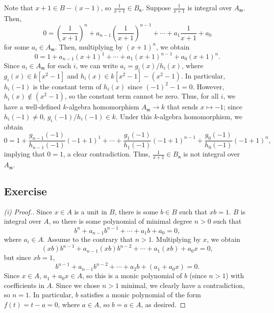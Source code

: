 Note that $x+1 \in B - (x-1)$, so $\frac{1}{x+1} \in B_{\mathfrak{n}}$. Suppose $\frac{1}{x+1}$ is integral over $A_{\mathfrak{m}}$. Then,
$$0 = \left(\frac{1}{x+1}\right)^n + a_{n-1}\left(\frac{1}{x+1}\right)^{n-1} + \cdots + a_1 \frac{1}{x+1} + a_0$$
for some $a_i \in A_{\mathfrak{m}}$. Then, multiplying by $(x+1)^n$, we obtain
$$0 = 1 + a_{n-1}(x+1)^1 + \cdots + a_1 (x+1)^{n-1} + a_0 (x+1)^n.$$
Since $a_i \in A_{\mathfrak{m}}$ for each $i$, we can write $a_i = g_i(x)/h_i(x)$, where $g_i(x) \in k[x^2-1]$ and $h_i(x) \in k[x^2 - 1] - (x^2 - 1)$. In particular,
$h_i(-1)$ is the constant term of $h_i(x)$ since $(-1)^2 - 1 = 0$. However, $h_i(x) \not\in (x^2 - 1)$, so the constant term cannot be zero. Thus, for all $i$, we have
a well-defined $k$-algebra homomorphism $A_{\mathfrak{m}} \to k$ that sends $x \mapsto -1$; since $h_i(-1) \neq 0$, $g_i(-1)/h_i(-1) \in k$. Under this $k$-algebra homomorphism,
we obtain
$$0 = 1 + \frac{g_{n-1}(-1)}{h_{n-1}(-1)}(-1+1)^1 + \cdots + \frac{g_{1}(-1)}{h_{1}(-1)} (-1+1)^{n-1} + \frac{g_{0}(-1)}{h_{0}(-1)} (-1+1)^n,$$
implying that $0 = 1$, a clear contradiction. Thus, $\frac{1}{x+1} \in B_{\mathfrak{n}}$ is not integral over $A_{\mathfrak{m}}$.

\subsection{Exercise}\label{5.5}

\begin{proof}[(i) Proof.]
Since $x \in A$ is a unit in $B$, there is some $b \in B$ such that $xb = 1$. $B$ is integral over $A$, so there is some polynomial of
minimal degree $n > 0$ such that 
$$b^n + a_{n-1}b^{n-1} + \cdots + a_1 b + a_0 = 0,$$
where $a_i \in A$. Assume to the contrary that $n > 1$. Multiplying by $x$, we obtain
$$(xb)b^{n-1} + a_{n-1} (xb) b^{n-2} + \cdots + a_1 (xb) + a_0 x = 0,$$
but since $xb = 1$,
$$b^{n-1} + a_{n-1} b^{n-2} + \cdots + a_2 b + (a_1 + a_0 x) = 0.$$
Since $x \in A$, $a_1 + a_0 x \in A$, so this is a monic polynomial of $b$ (since $n > 1$) with coefficients in $A$. Since we chose $n > 1$ 
minimal, we clearly have a contradiction, so $n = 1$. In particular, $b$ satisfies a monic polynomial of the form $f(t) = t - a = 0$,
where $a \in A$, so $b = a \in A$, as desired.
\end{proof}

